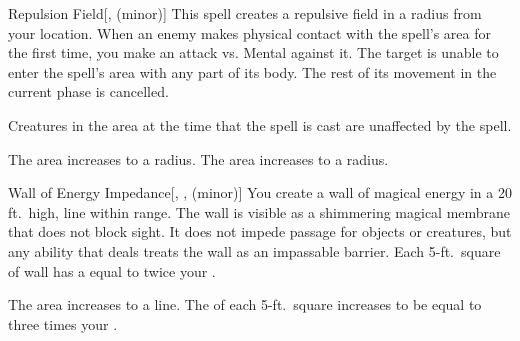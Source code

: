 \lowercase{\hypertarget{spell:Repulsion Field}{}}\label{spell:Repulsion Field}
\begin{freeability}[Rank 3]{\hypertarget{spell:Repulsion Field}{Repulsion Field}}[,  (minor)]
This spell creates a repulsive field in a \areamed radius  from your location.
When an enemy makes physical contact with the spell's area for the first time, you make an attack vs. Mental against it.
\hit The target is unable to enter the spell's area with any part of its body.
The rest of its movement in the current phase is cancelled.

Creatures in the area at the time that the spell is cast are unaffected by the spell.

\rankline
{} The area increases to a \arealarge radius.
 The area increases to a \areahuge radius.

\end{freeability}
\vspace{0.25em}



\lowercase{\hypertarget{spell:Wall of Energy Impedance}{}}\label{spell:Wall of Energy Impedance}
\begin{freeability}[Rank 3]{\hypertarget{spell:Wall of Energy Impedance}{Wall of Energy Impedance}}[, ,  (minor)]
\targetrule
You create a wall of magical energy in a 20 ft.\ high, \areamed line within \rngmed range.
The wall is visible as a shimmering magical membrane that does not block sight.
It does not impede passage for objects or creatures, but any ability that deals  treats the wall as an impassable barrier.
Each 5-ft.\ square of wall has a  equal to twice your .

\rankline
{} The area increases to a \arealarge line.
 The  of each 5-ft.\ square increases to be equal to three times your .

\end{freeability}
\vspace{0.25em}



